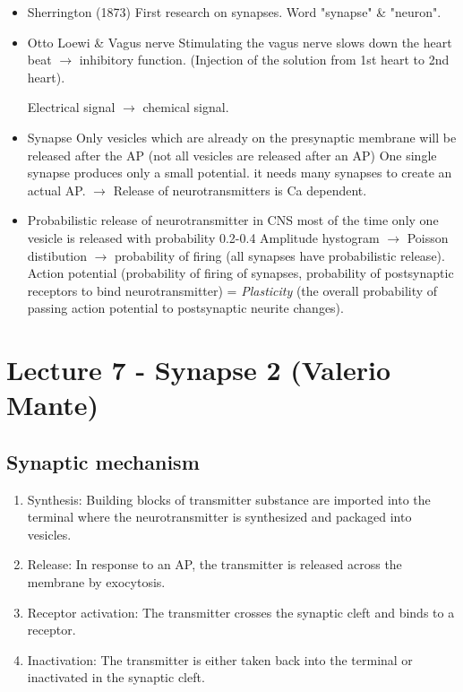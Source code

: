 \documentclass[english,11pt]{article}
\begin{document}
\begin{itemize}
\item Sherrington (1873)
\subitem First research on synapses. Word "synapse" \& "neuron".
\item Otto Loewi \& Vagus nerve
\subitem Stimulating the vagus nerve slows down the heart beat $\rightarrow$ inhibitory function. (Injection of the solution from 1st heart to 2nd heart).

\begin{center}
Electrical signal $\rightarrow$ chemical signal.
\end{center}

\item Synapse
\subitem Only vesicles which are already on the presynaptic membrane will be released after the AP (not all vesicles are released after an AP)
\subitem One single synapse produces only a small potential. it needs many synapses to create an actual AP. $\rightarrow$ Release of neurotransmitters is Ca dependent.
\item Probabilistic release of neurotransmitter
\subitem in CNS most of the time only one vesicle is released with probability 0.2-0.4
\subitem Amplitude hystogram $\rightarrow$ Poisson distibution $\rightarrow$ probability of firing
(all synapses have probabilistic release).
\subitem Action potential (probability of firing of synapses, probability of postsynaptic receptors to bind neurotransmitter) = \textit{Plasticity} (the overall probability of passing action potential to postsynaptic neurite changes).
\end{itemize}








\section{Lecture 7 - Synapse 2 (Valerio Mante)}

\subsection{Synaptic mechanism}
\begin{enumerate}
\item Synthesis: Building blocks of transmitter substance are imported into the terminal where the neurotransmitter is synthesized and packaged into vesicles.
\item Release: In response to an AP, the transmitter is released across the membrane by exocytosis.
\item Receptor activation: The transmitter crosses the synaptic cleft and binds to a receptor.
\item Inactivation: The transmitter is either taken back into the terminal or inactivated in the synaptic cleft.
\end{enumerate}
\end{document}
